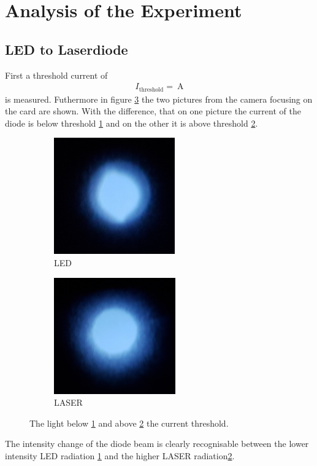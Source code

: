 \section{Analysis of the Experiment}
\label{sec:Auswertung}



\subsection{LED to Laserdiode}
\label{sec:LED_Laser}
First a threshold current of
\begin{align}
I_{\mathrm{threshold}} = \SI{}{\ampere}
\end{align}
is measured.
Futhermore in figure \ref{fig:threshold} the two
pictures from the camera focusing on the card are shown.
With the difference, that on one picture the current of the diode is below threshold \ref{fig:LED} and
on the other it is above threshold \ref{fig:LASER}.
\begin{figure}
  \centering
  \begin{subfigure}{0.45\textwidth}
    \centering
    \includegraphics[height = 5cm]{figures/bevore_threshole.jpg}
    \caption{LED}
    \label{fig:LED}
  \end{subfigure}
  \begin{subfigure}{0.45\textwidth}
    \centering
    \includegraphics[height = 5cm]{figures/after_threshole.jpg}
    \caption{LASER}
    \label{fig:LASER}
  \end{subfigure}
\caption{The light below \ref{fig:LED} and above \ref{fig:LASER} the current threshold.}
\label{fig:threshold}
\end{figure}
The intensity change of the diode beam is clearly recognisable
between the lower intensity LED radiation \ref{fig:LED}
and the higher LASER radiation\ref{fig:LASER}.

